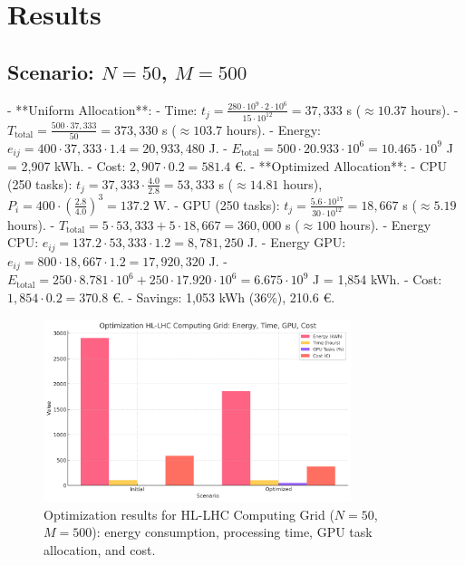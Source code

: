 \documentclass[a4paper,11pt]{article}
\begin{document}
\section{Results}

\subsection{Scenario: \texorpdfstring{$N=50$, $M=500$}{N=50, M=500}}
- **Uniform Allocation**:
  - Time: $t_j = \frac{280 \cdot 10^9 \cdot 2 \cdot 10^6}{15 \cdot 10^{12}} = 37,333$ s ($\approx 10.37$ hours).
  - $T_{\text{total}} = \frac{500 \cdot 37,333}{50} = 373,330$ s ($\approx 103.7$ hours).
  - Energy: $e_{ij} = 400 \cdot 37,333 \cdot 1.4 = 20,933,480$ J.
  - $E_{\text{total}} = 500 \cdot 20.933 \cdot 10^6 = 10.465 \cdot 10^9$ J = 2,907 kWh.
  - Cost: $2,907 \cdot 0.2 = 581.4$ €.
- **Optimized Allocation**:
  - CPU (250 tasks): $t_j = 37,333 \cdot \frac{4.0}{2.8} = 53,333$ s ($\approx 14.81$ hours), $P_i = 400 \cdot \left( \frac{2.8}{4.0} \right)^3 = 137.2$ W.
  - GPU (250 tasks): $t_j = \frac{5.6 \cdot 10^{17}}{30 \cdot 10^{12}} = 18,667$ s ($\approx 5.19$ hours).
  - $T_{\text{total}} = 5 \cdot 53,333 + 5 \cdot 18,667 = 360,000$ s ($\approx 100$ hours).
  - Energy CPU: $e_{ij} = 137.2 \cdot 53,333 \cdot 1.2 = 8,781,250$ J.
  - Energy GPU: $e_{ij} = 800 \cdot 18,667 \cdot 1.2 = 17,920,320$ J.
  - $E_{\text{total}} = 250 \cdot 8.781 \cdot 10^6 + 250 \cdot 17.920 \cdot 10^6 = 6.675 \cdot 10^9$ J = 1,854 kWh.
  - Cost: $1,854 \cdot 0.2 = 370.8$ €.
  - Savings: 1,053 kWh (36\%), 210.6 €.

\begin{figure}[htbp]
    \centering
    \includegraphics[width=0.8\textwidth]{optimization_chart.png}
    \caption{\texorpdfstring{Optimization results for HL-LHC Computing Grid ($N=50$, $M=500$)}{Optimization results for HL-LHC Computing Grid (N=50, M=500)}: energy consumption, processing time, GPU task allocation, and cost.}
    \label{fig:results}
\end{figure}
\end{document}
